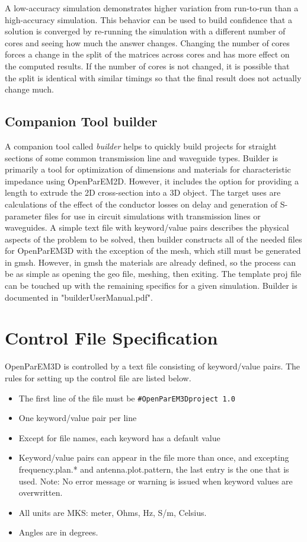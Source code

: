 \documentclass[titlepage]{article}
\renewcommand\_{\textunderscore\linebreak[1]}
\begin{document}
A low-accuracy simulation demonstrates higher variation from run-to-run than a high-accuracy simulation.  This behavior can be used to build confidence that a solution is converged by re-running the simulation with a different number of cores and seeing how much the answer changes.  Changing the number of cores forces a change in the split of the matrices across cores and has more effect on the computed results.  If the number of cores is not changed, it is possible that the split is identical with similar timings so that the final result does not actually change much.

\subsection{Companion Tool builder}

A companion tool called \textit{builder} helps to quickly build projects for straight sections of some common transmission line and waveguide types. Builder is primarily a tool for optimization of dimensions and materials for characteristic impedance using OpenParEM2D.  However, it includes the option for providing a length to extrude the 2D cross-section into a 3D object. The target uses are calculations of the effect of the conductor losses on delay and generation of S-parameter files for use in circuit simulations with transmission lines or waveguides.
A simple text file with keyword/value pairs describes the physical aspects of the problem to be solved, then builder constructs all of the needed files for OpenParEM3D with the exception of the mesh, which still must be generated in gmsh.  However, in gmsh the materials are already defined, so the process can be as simple as opening the geo file, meshing, then exiting.  The template proj file can be touched up with the remaining specifics for a given simulation. Builder is documented in "builder\_User\_Manual.pdf".

\appendix

\newpage
\section{Control File Specification}
\label{sec:control_file_spec}

OpenParEM3D is controlled by a text file consisting of keyword/value pairs.  The rules for setting up the control file are listed below.
\begin{itemize}[nosep]
  \item The first line of the file must be \verb+#OpenParEM3Dproject 1.0+
  \item One keyword/value pair per line
  \item Except for file names, each keyword has a default value
  \item Keyword/value pairs can appear in the file more than once, and excepting frequency.plan.* and antenna.plot.pattern, the last entry is the one that is used.  Note: No error message or warning is issued when keyword values are overwritten.
  \item All units are MKS: meter, Ohms, Hz, S/m, Celsius.
  \item Angles are in degrees.
\end{itemize}
\end{document}
